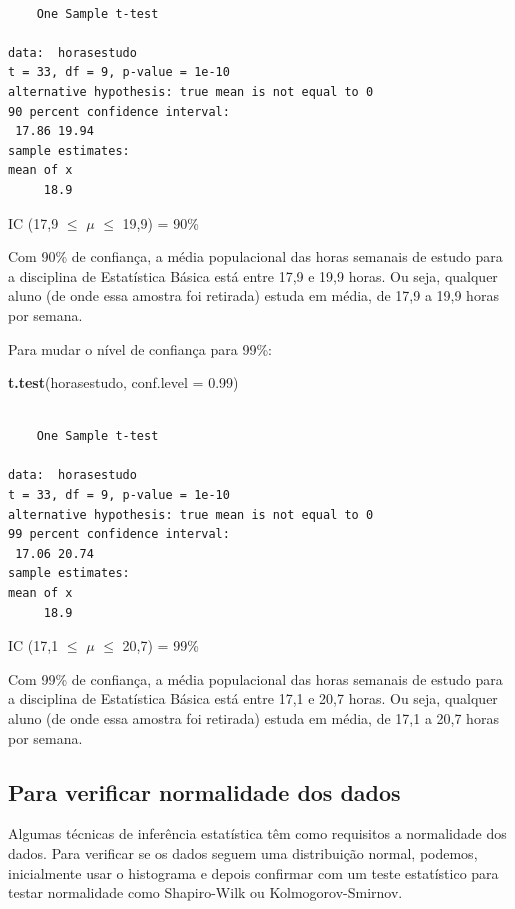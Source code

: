 \documentclass[12pt,portuguese,oneside]{book}
\newenvironment{Shaded}{\begin{snugshade}}{\end{snugshade}}
\newcommand{\KeywordTok}[1]{\textcolor[rgb]{0.13,0.29,0.53}{\textbf{#1}}}
\newcommand{\DataTypeTok}[1]{\textcolor[rgb]{0.13,0.29,0.53}{#1}}
\newcommand{\FloatTok}[1]{\textcolor[rgb]{0.00,0.00,0.81}{#1}}
\newcommand{\NormalTok}[1]{#1}
\begin{document}
\begin{verbatim}

    One Sample t-test

data:  horasestudo
t = 33, df = 9, p-value = 1e-10
alternative hypothesis: true mean is not equal to 0
90 percent confidence interval:
 17.86 19.94
sample estimates:
mean of x 
     18.9 
\end{verbatim}

IC (17,9 \(\leq\) \(\mu\) \(\leq\) 19,9) = 90\%

Com 90\% de confiança, a média populacional das horas semanais de estudo
para a disciplina de Estatística Básica está entre 17,9 e 19,9 horas. Ou
seja, qualquer aluno (de onde essa amostra foi retirada) estuda em
média, de 17,9 a 19,9 horas por semana.

Para mudar o nível de confiança para 99\%:

\begin{Shaded}
\begin{Highlighting}[]
\KeywordTok{t.test}\NormalTok{(horasestudo, }\DataTypeTok{conf.level =} \FloatTok{0.99}\NormalTok{)}
\end{Highlighting}
\end{Shaded}

\begin{verbatim}

    One Sample t-test

data:  horasestudo
t = 33, df = 9, p-value = 1e-10
alternative hypothesis: true mean is not equal to 0
99 percent confidence interval:
 17.06 20.74
sample estimates:
mean of x 
     18.9 
\end{verbatim}

IC (17,1 \(\leq\) \(\mu\) \(\leq\) 20,7) = 99\%

Com 99\% de confiança, a média populacional das horas semanais de estudo
para a disciplina de Estatística Básica está entre 17,1 e 20,7 horas. Ou
seja, qualquer aluno (de onde essa amostra foi retirada) estuda em
média, de 17,1 a 20,7 horas por semana.

\subsection{Para verificar normalidade dos
dados}\label{para-verificar-normalidade-dos-dados}

Algumas técnicas de inferência estatística têm como requisitos a
normalidade dos dados. Para verificar se os dados seguem uma
distribuição normal, podemos, inicialmente usar o histograma e depois
confirmar com um teste estatístico para testar normalidade como
Shapiro-Wilk ou Kolmogorov-Smirnov.
\end{document}
